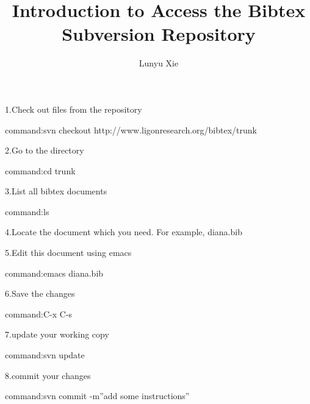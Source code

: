 \documentclass{article}
\begin{document}
\title{Introduction to Access the Bibtex Subversion Repository}
\author{Lunyu Xie}
\maketitle
1.Check out files from the repository

command:svn checkout http://www.ligonresearch.org/bibtex/trunk


2.Go to the directory

command:cd trunk


3.List all bibtex documents

command:ls


4.Locate the  document which you need. For example, diana.bib


5.Edit this document using emacs

command:emacs diana.bib


6.Save the changes

command:C-x C-s


7.update your working copy

command:svn update


8.commit your changes

command:svn commit -m''add some instructions''
\end{document}
